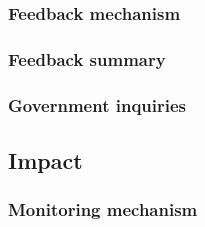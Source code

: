 \documentclass{article}
\begin{document}
\subsubsection{Feedback mechanism}


\subsubsection{Feedback summary}


\subsubsection{Government inquiries}


\subsection{Impact}
\subsubsection{Monitoring mechanism}
\end{document}
